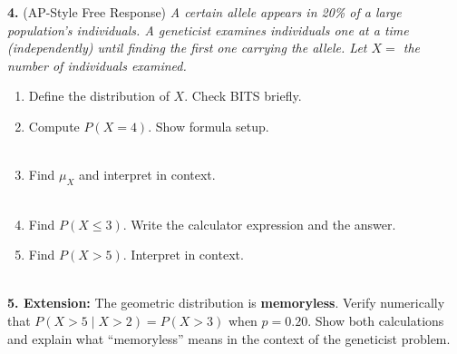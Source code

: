 \documentclass[10pt]{article}
\begin{document}
\begin{practicebox}
\vspace{8pt}
\textbf{4.} (AP-Style Free Response) \textit{A certain allele appears in 20\% of
a large population's individuals. A geneticist examines individuals one at a time
(independently) until finding the first one carrying the allele.
Let $X =$ the number of individuals examined.}
\begin{enumerate}[label=(\alph*), leftmargin=2em, itemsep=8pt]
  \item Define the distribution of $X$. Check BITS briefly.\\
  \item Compute $P(X = 4)$. Show formula setup.\\
        \writeline\\[1pt]\writeline\gradedhide{\hrulefill}\gradedright{\raisebox{-2pt}{\gradedblank[id=hw4b, type=short, points=2, answer=0.1024, check=numeric, tolerance=0.001]{0.9in}{0.2in}}}
\tcbbreak
  \item Find $\mu_X$ and interpret in context.\\
        \writeline\gradedhide{\hrulefill}\gradedright{\raisebox{-2pt}{\gradedblank[id=hw4c1, type=short, points=1, answer=5, check=numeric, tolerance=0]{0.9in}{0.2in}}}\\[6pt]
  \item Find $P(X \le 3)$. Write the calculator expression and the answer.\\
        \writeline\gradedhide{\hrulefill}\gradedright{\raisebox{-2pt}{\gradedblank[id=hw4d, type=short, points=1, answer=0.488, check=numeric, tolerance=0.002]{0.9in}{0.2in}}}
  \item Find $P(X > 5)$. Interpret in context.\\
        \writeline\gradedhide{\hrulefill}\gradedright{\raisebox{-2pt}{\gradedblank[id=hw4e1, type=short, points=1, answer=0.3277, check=numeric, tolerance=0.002]{0.9in}{0.2in}}}\\[6pt]
\end{enumerate}

\vspace{8pt}
\textbf{5. Extension:} The geometric distribution is \textbf{memoryless}.
Verify numerically that $P(X > 5 \mid X > 2) = P(X > 3)$ when $p = 0.20$.
Show both calculations and explain what ``memoryless'' means in the context
of the geneticist problem.

\vspace{4pt}
\writeline\\[1pt]\writeline\\[1pt]\writeline

\end{practicebox}
\end{document}
